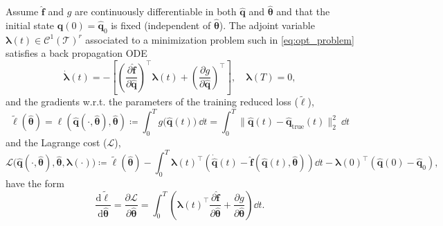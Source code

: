 \begin{theorem}
    \label{thm:adjoint_method}
    Assume $\hat{\mathbf{f}}$ and $g$ are continuously differentiable in both $\hat{\mathbf{q}}$ and $\hat{\bm{\theta}}$ and that the initial state $\hat{\mathbf{q}}(0)=\hat{\mathbf{q}}_0$ is fixed (independent of $\hat{\bm{\theta}}$). The adjoint variable $\bm{\lambda}(t)\in\mathcal{C}^1(\mathcal{T})^r$ associated to a minimization problem such in \eqref{eq:opt_problem} satisfies a back propagation ODE\\ 
    \begin{equation}
        \dot{\bm{\lambda}}(t) = -\left[ \left(\dfrac{\partial \hat{\mathbf{f}}}{\partial\hat{\mathbf{q}}}\right)^{\top}\bm{\lambda}(t) + \left( \dfrac{\partial g}{\partial \hat{\mathbf{q}}} \right)^{\top} \right],\quad\bm{\lambda}(T)=0,
        \label{eq:adjoint_eqs}
    \end{equation}
    and the gradients w.r.t. the parameters of the training reduced loss ($\tilde\ell$),\\
    \begin{equation*}
        \tilde{\ell}(\hat{\bm{\theta}}) = \ell(\hat{\mathbf{q}}(\cdot,\hat{\bm{\theta}}),\hat{\bm{\theta}}) \coloneqq \displaystyle\int_0^T g\bigl(\hat{\mathbf{q}}(t)\bigr)~\dd t = \int_0^T \bigl\|\hat{\mathbf{q}}(t) - \hat{\mathbf{q}}_{\mathrm{true}}(t)\bigr\|_2^2~\dd t
    \end{equation*}
    and the Lagrange cost ($\mathscr{L}$),\\
    \begin{equation*}
        \mathscr{L}\bigl(\hat{\mathbf{q}}(\cdot,\hat{\bm{\theta}}),\hat{\bm{\theta}},\bm{\lambda}(\cdot)\bigr) \coloneqq \tilde{\ell}(\hat{\bm{\theta}}) - \int_0^T \bm{\lambda}(t)^{\top}\left( \dot{\hat{\mathbf{q}}}(t)-\hat{\mathbf{f}}(\hat{\mathbf{q}}(t),\hat{\bm{\theta}}) \right)\dd t - \bm{\lambda}(0)^{\top}(\hat{\mathbf{q}}(0)-\hat{\mathbf{q}}_0),
        \label{eq:lagrange_cost2}
    \end{equation*}
    have the form\\
    \begin{equation}
        \dfrac{\mathrm{d} \tilde{\ell}}{\mathrm{d} \hat{\bm{\theta}}} = \dfrac{\partial \mathscr{L}}{\partial\hat{\bm{\theta}}} = \int_0^T \left(\bm{\lambda}(t)^{\top}\dfrac{\partial\hat{\mathbf{f}}}{\partial\hat{\bm{\theta}}} + \dfrac{\partial g}{\partial\hat{\bm{\theta}}} \right)\dd t.
        \label{eq:gradient_lagrange}
    \end{equation}
\end{theorem}

